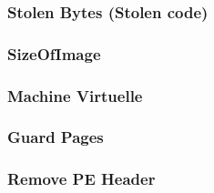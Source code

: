 \documentclass[10pt,a4paper]{article}
\begin{document}
\subsubsection{Stolen Bytes (Stolen code)} 
 
\subsubsection{SizeOfImage}                
 
\subsubsection{Machine Virtuelle}          
 
\subsubsection{Guard Pages}                
 
\subsubsection{Remove PE Header}           
 
	
\newpage	




\nocite{FILIOL1}
\nocite{FILIOL2}
\nocite{FERRIE1}

\nocite{VXHEAVEN1}
\nocite{CODEPROJECT1}
\nocite{INFOSECINSTITUTE1}
\nocite{MALWAREBYTES1}
\nocite{ANTUKH1}
\nocite{SYMANTEC1}
\nocite{SPARECLOCKCYCLES1}
\nocite{SECURITYXPLODED1}
\nocite{INFOSECINSTITUTE2}
\nocite{OPENSECURITYRESEARCH1}
\nocite{JBREMER1}
\nocite{HACKADEMICS1}
\nocite{OMNISECU1}
\nocite{VANISH1}
\nocite{INFOSECTODAY1}
\nocite{STEGOMALWARE1}
\nocite{KASPERSKY1}
\end{document}
